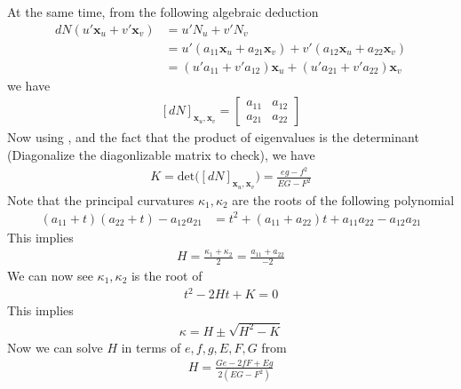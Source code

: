 \documentclass{report}
\begin{document}
\begin{mdframed}
At the same time, from the following algebraic deduction 
\begin{align*}
dN(u' \textbf{x}_u + v' \textbf{x}_v)&=u'N_u +v'N_v\\
&=u'(a_{11} \textbf{x}_u + a_{21}\textbf{x}_v)+ v'(a_{12}\textbf{x}_u+ a_{22}\textbf{x}_v)\\
&=(u'a_{11}+v'a_{12})\textbf{x}_u + (u'a_{21}+v'a_{22})\textbf{x}_v
\end{align*}
we have 
\begin{align}
\label{dN2}
  [dN]_{\textbf{x}_u,\textbf{x}_v}=\begin{bmatrix}
    a_{11} & a_{12}\\
    a_{21} & a_{22}
  \end{bmatrix}
\end{align}
Now using , and the fact that the product of eigenvalues is the determinant (Diagonalize the diagonlizable matrix to check), we have 
\begin{align*}
K=\text{det}\Big([dN]_{\textbf{x}_u,\textbf{x}_v} \Big)= \frac{eg-f^2}{EG-F^2}
\end{align*}
Note that the principal curvatures $\kappa_1,\kappa_2$ are the roots of the following polynomial
\begin{align*}
  (a_{11}+t)(a_{22}+t)-a_{12}a_{21}&=t^2+ (a_{11}+a_{22})t+a_{11}a_{22}-a_{12}a_{21}
\end{align*}
This implies 
\begin{align*}
H=\frac{\kappa _1+ \kappa_2}{2}= \frac{a_{11}+a_{22}}{-2}
\end{align*}
We can now see $\kappa_1,\kappa_2$ is the root of 
\begin{align*}
t^2 -2Ht+K=0
\end{align*}
This implies 
\begin{align*}
\kappa= H\pm \sqrt{H^2-K} 
\end{align*}
Now we can solve $H$ in terms of $e,f,g,E,F,G$ from  
\begin{align*}
H=\frac{Ge-2fF+Eg}{2(EG-F^2)}
\end{align*}
\end{mdframed}
\end{document}
